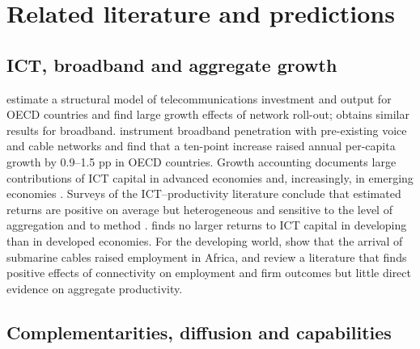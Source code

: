 \documentclass[pdflatex,sn-basic]{sn-jnl}%
\theoremstyle{thmstyleone}
\theoremstyle{thmstyletwo}
\begin{document}
\section{Related literature and predictions}\label{sec:lit}

\subsection{ICT, broadband and aggregate growth}

\citet{roller2001telecom} estimate a structural model of telecommunications investment and output for OECD countries and find large growth effects of network roll-out; \citet{koutroumpis2009broadband} obtains similar results for broadband. \citet{czernich2011broadband} instrument broadband penetration with pre-existing voice and cable networks and find that a ten-point increase raised annual per-capita growth by 0.9--1.5 pp in OECD countries. Growth accounting documents large contributions of ICT capital in advanced economies and, increasingly, in emerging economies \citep{jorgenson2008retro,jorgenson2016ict}. Surveys of the ICT--productivity literature conclude that estimated returns are positive on average but heterogeneous and sensitive to the level of aggregation and to method \citep{cardona2013ict,vu2020ict}. \citet{niebel2018ict} finds no larger returns to ICT capital in developing than in developed economies. For the developing world, \citet{hjort2019internet} show that the arrival of submarine cables raised employment in Africa, and \citet{hjort2025connectivity} review a literature that finds positive effects of connectivity on employment and firm outcomes but little direct evidence on aggregate productivity.

\subsection{Complementarities, diffusion and capabilities}
\end{document}
